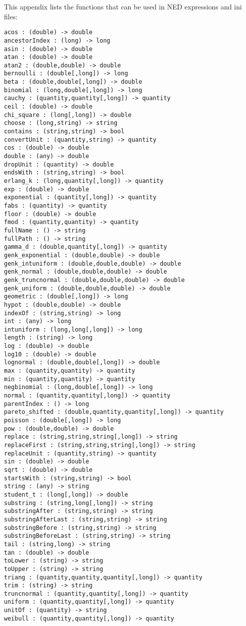 \label{cha:ned-functions}

This appendix lists the functions that can be used in NED
expressions and ini files:

%
%


\begin{verbatim}
acos : (double) -> double
ancestorIndex : (long) -> long
asin : (double) -> double
atan : (double) -> double
atan2 : (double,double) -> double
bernoulli : (double[,long]) -> long
beta : (double,double[,long]) -> double
binomial : (long,double[,long]) -> long
cauchy : (quantity,quantity[,long]) -> quantity
ceil : (double) -> double
chi_square : (long[,long]) -> double
choose : (long,string) -> string
contains : (string,string) -> bool
convertUnit : (quantity,string) -> quantity
cos : (double) -> double
double : (any) -> double
dropUnit : (quantity) -> double
endsWith : (string,string) -> bool
erlang_k : (long,quantity[,long]) -> quantity
exp : (double) -> double
exponential : (quantity[,long]) -> quantity
fabs : (quantity) -> quantity
floor : (double) -> double
fmod : (quantity,quantity) -> quantity
fullName : () -> string
fullPath : () -> string
gamma_d : (double,quantity[,long]) -> quantity
genk_exponential : (double,double) -> double
genk_intuniform : (double,double,double) -> double
genk_normal : (double,double,double) -> double
genk_truncnormal : (double,double,double) -> double
genk_uniform : (double,double,double) -> double
geometric : (double[,long]) -> long
hypot : (double,double) -> double
indexOf : (string,string) -> long
int : (any) -> long
intuniform : (long,long[,long]) -> long
length : (string) -> long
log : (double) -> double
log10 : (double) -> double
lognormal : (double,double[,long]) -> double
max : (quantity,quantity) -> quantity
min : (quantity,quantity) -> quantity
negbinomial : (long,double[,long]) -> long
normal : (quantity,quantity[,long]) -> quantity
parentIndex : () -> long
pareto_shifted : (double,quantity,quantity[,long]) -> quantity
poisson : (double[,long]) -> long
pow : (double,double) -> double
replace : (string,string,string[,long]) -> string
replaceFirst : (string,string,string[,long]) -> string
replaceUnit : (quantity,string) -> quantity
sin : (double) -> double
sqrt : (double) -> double
startsWith : (string,string) -> bool
string : (any) -> string
student_t : (long[,long]) -> double
substring : (string,long[,long]) -> string
substringAfter : (string,string) -> string
substringAfterLast : (string,string) -> string
substringBefore : (string,string) -> string
substringBeforeLast : (string,string) -> string
tail : (string,long) -> string
tan : (double) -> double
toLower : (string) -> string
toUpper : (string) -> string
triang : (quantity,quantity,quantity[,long]) -> quantity
trim : (string) -> string
truncnormal : (quantity,quantity[,long]) -> quantity
uniform : (quantity,quantity[,long]) -> quantity
unitOf : (quantity) -> string
weibull : (quantity,quantity[,long]) -> quantity
\end{verbatim}

